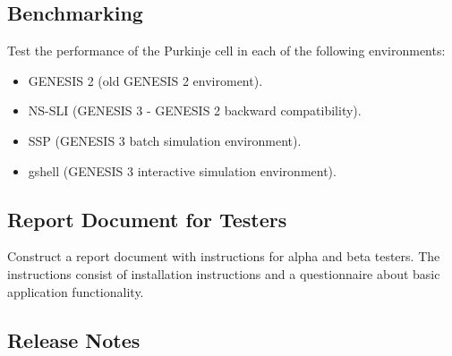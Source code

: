 \documentclass[12pt]{article}
\begin{document}
\subsection{Benchmarking}

Test the performance of the Purkinje cell in each of the following
environments:

\begin{itemize}
\item GENESIS 2 (old GENESIS 2 enviroment).
\item NS-SLI (GENESIS 3 - GENESIS 2 backward compatibility).
\item SSP (GENESIS 3 batch simulation environment).
\item gshell (GENESIS 3 interactive simulation environment).
\end{itemize}


\subsection{Report Document for Testers}

Construct a report document with instructions for alpha and beta
testers.  The instructions consist of installation instructions and a
questionnaire about basic application functionality.


\subsection{Release Notes}
\end{document}
